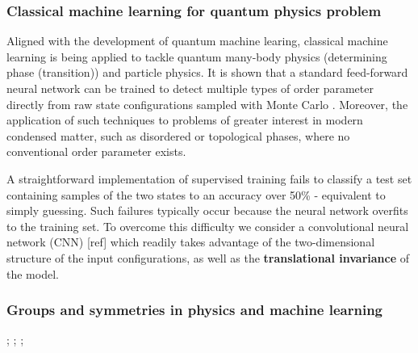 \subsubsection{Classical machine learning for quantum physics problem}
Aligned with the development of quantum machine learing, classical machine learning is being applied to tackle quantum many-body physics (determining phase (transition)) and particle physics.
It is shown that a standard feed-forward neural network can be trained to detect multiple types of order parameter directly from raw state configurations sampled with Monte Carlo \cite{carrasquillaMachineLearningPhases2017}.
Moreover, the application of such techniques to problems of greater interest in modern condensed matter, such as disordered or topological phases, where no conventional order parameter exists.
\cite{carleoSolvingQuantumManyBody2017}
\begin{remark}
	A straightforward implementation of supervised training fails to classify a test set containing samples of the two states to an accuracy over 50\% - equivalent to simply guessing. Such failures typically occur because the neural network overfits to the training set. 
	To overcome this difficulty we consider a convolutional neural network (CNN) [ref] which readily takes advantage of the two-dimensional structure of the input conﬁgurations, as well as the \textbf{translational invariance} of the model.
\end{remark}

\subsubsection{Groups and symmetries in physics and machine learning}
\cite{kondorGroupTheoreticalMethods2008};
\cite{bogatskiyLorentzGroupEquivariant2020};
\cite{bogatskiySymmetryGroupEquivariant2022};

